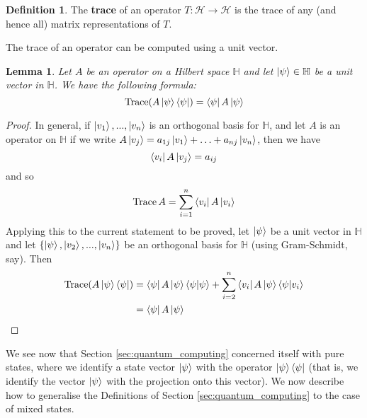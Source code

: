 \documentclass[12pt]{article}
\theoremstyle{plain}
\newtheorem{lemma}[thm]{Lemma}
\theoremstyle{definition}
\newtheorem{defn}[thm]{Definition} %
\newcommand{\bb}[1]{\mathbb{#1}}
\newcommand{\call}[1]{\mathcal{#1}}
\newcommand{\lto}{\longrightarrow}
\begin{document}
	\begin{defn}
		The \textbf{trace} of an operator $T: \call{H} \lto \call{H}$ is the trace of any (and hence all) matrix representations of $T$.
	\end{defn}
	The trace of an operator can be computed using a unit vector.
	\begin{lemma}\label{lem:trace_evaluation}
		Let $A$ be an operator on a Hilbert space $\bb{H}$ and let $\ket{\psi} \in \bb{H}$ be a unit vector in $\bb{H}$. We have the following formula:
		\begin{equation}
			\operatorname{Trace}(A\ket{\psi}\bra{\psi}) = \bra{\psi}A\ket{\psi}
		\end{equation}
	\end{lemma}
	\begin{proof}
		 In general, if $\ket{v_1},...,\ket{v_n}$ is an orthogonal basis for $\bb{H}$, and let $A$ is an operator on $\bb{H}$ if we write $A\ket{v_j} = a_{1j}\ket{v_1} + \hdots + a_{nj}\ket{v_n}$, then we have
		\begin{equation}
			\bra{v_i}A\ket{v_j} = a_{ij}
		\end{equation}
		and so
		\begin{equation}
			\operatorname{Trace}A = \sum_{i = 1}^n \bra{v_i}A\ket{v_i}
		\end{equation}
	Applying this to the current statement to be proved, let $\ket{\psi}$ be a unit vector in $\bb{H}$ and let $\lbrace \ket{\psi},\ket{v_2},...,\ket{v_n}\rbrace$ be an orthogonal basis for $\bb{H}$ (using Gram-Schmidt, say). Then
		\begin{align*}
			\operatorname{Trace}(A\ket{\psi}\bra{\psi}) &= \bra{\psi}A\ket{\psi}\bra{\psi}\ket{\psi} + \sum_{i = 2}^n \bra{v_i}A\ket{\psi}\bra{\psi}\ket{v_i}\\
			&= \bra{\psi}A\ket{\psi}
		\end{align*}
	\end{proof}
	We see now that Section \ref{sec:quantum_computing} concerned itself with pure states, where we identify a state vector $\ket{\psi}$ with the operator $\ket{\psi}\bra{\psi}$ (that is, we identify the vector $\ket{\psi}$ with the projection onto this vector). We now describe how to generalise the Definitions of Section \ref{sec:quantum_computing} to the case of mixed states.
	
\end{document}
